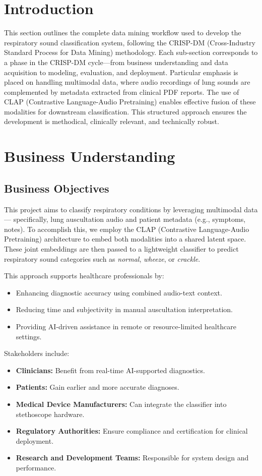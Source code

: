 

\section*{Introduction}
This section outlines the complete data mining workflow used to develop the respiratory sound classification system, following the CRISP-DM (Cross-Industry Standard Process for Data Mining) methodology. Each sub-section corresponds to a phase in the CRISP-DM cycle—from business understanding and data acquisition to modeling, evaluation, and deployment. Particular emphasis is placed on handling multimodal data, where audio recordings of lung sounds are complemented by metadata extracted from clinical PDF reports. The use of CLAP (Contrastive Language-Audio Pretraining) enables effective fusion of these modalities for downstream classification. This structured approach ensures the development is methodical, clinically relevant, and technically robust.

\newpage
\section{Business Understanding} 
\subsection{Business Objectives}
This project aims to classify respiratory conditions by leveraging multimodal data — specifically, lung auscultation audio and patient metadata (e.g., symptoms, notes). To accomplish this, we employ the CLAP \cite{hsu2023clap}  (Contrastive Language-Audio Pretraining) architecture to embed both modalities into a shared latent space. These joint embeddings are then passed to a lightweight classifier to predict respiratory sound categories such as \textit{normal}, \textit{wheeze}, or \textit{crackle}.

This approach supports healthcare professionals by:
\begin{itemize}
    \item Enhancing diagnostic accuracy using combined audio-text context.
    \item Reducing time and subjectivity in manual auscultation interpretation.
    \item Providing AI-driven assistance in remote or resource-limited healthcare settings.
\end{itemize}

Stakeholders include:
\begin{itemize}
    \item \textbf{Clinicians:} Benefit from real-time AI-supported diagnostics.
    \item \textbf{Patients:} Gain earlier and more accurate diagnoses.
    \item \textbf{Medical Device Manufacturers:} Can integrate the classifier into stethoscope hardware.
    \item \textbf{Regulatory Authorities:} Ensure compliance and certification for clinical deployment.
    \item \textbf{Research and Development Teams:} Responsible for system design and performance.
\end{itemize}

